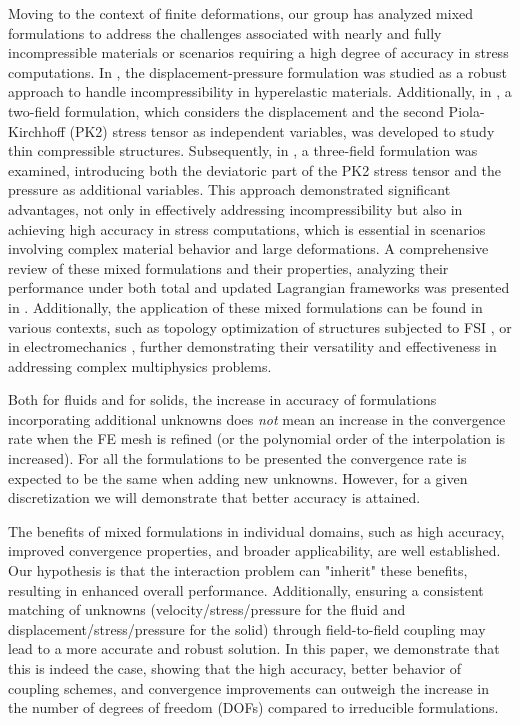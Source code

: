 \documentclass[11pt,english]{article}
\begin{document}
Moving to the context of finite deformations, our group has analyzed mixed formulations to address the challenges associated with nearly and fully incompressible materials or scenarios requiring a high degree of accuracy in stress computations. In \cite{Castanar2020,moreno2025mixed}, the displacement-pressure formulation was studied as a robust approach to handle incompressibility in hyperelastic materials. Additionally, in \cite{aguirre2}, a two-field formulation, which considers the displacement and the second Piola-Kirchhoff (PK2) stress tensor as independent variables, was developed to study thin compressible structures. Subsequently, in \cite{Castanar2023}, a three-field formulation was examined, introducing both the deviatoric part of the PK2 stress tensor and the pressure as additional variables. This approach demonstrated significant advantages, not only in effectively addressing incompressibility but also in achieving high accuracy in stress computations, which is essential in scenarios involving complex material behavior and large deformations. A comprehensive review of these mixed formulations and their properties, analyzing their performance under both total and updated Lagrangian frameworks was presented in \cite{CodinaCastanarBaiges2024}. Additionally, the application of these mixed formulations can be found in various contexts, such as topology optimization of structures subjected to FSI \cite{Castanar2024}, or in electromechanics \cite{Castanar2025}, further demonstrating their versatility and effectiveness in addressing complex multiphysics problems.

Both for fluids and for solids, the increase in accuracy of formulations incorporating additional unknowns does {\em not} mean an increase in the convergence rate when the FE mesh is refined (or the polynomial order of the interpolation is increased). For all the formulations to be presented the convergence rate is expected to be the same when adding new unknowns. However, for a given discretization we will demonstrate that better accuracy is attained. 

The benefits of mixed formulations in individual domains, such as high accuracy, improved convergence properties, and broader applicability, are well established. Our hypothesis is that the interaction problem can "inherit" these benefits, resulting in enhanced overall performance. Additionally, ensuring a consistent matching of unknowns (velocity/stress/pressure for the fluid and displacement/stress/pressure for the solid) through field-to-field coupling may lead to a more accurate and robust solution. In this paper, we demonstrate that this is indeed the case, showing that the high accuracy, better behavior of coupling schemes, and convergence improvements can outweigh the increase in the number of degrees of freedom (DOFs) compared to irreducible formulations.
\end{document}
